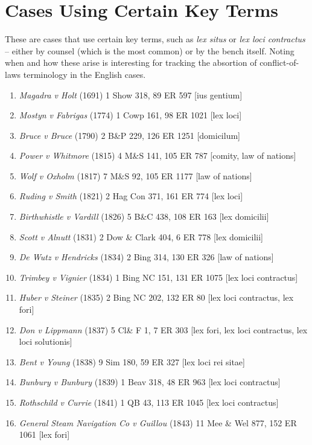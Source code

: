 \documentclass[twoside]{article}
\begin{document}
\section{Cases Using Certain Key Terms}

These are cases that use certain key terms, such as \textit{lex situs} or \textit{lex loci contractus} -- either by counsel (which is the most common) or by the bench itself. Noting when and how these arise is interesting for tracking the absortion of conflict-of-laws terminology in the English cases.
\\ 
\begin{enumerate}
\item{\textit{Magadra v Holt} (1691) 1 Show 318, 89 ER 597 [ius gentium]}
\item{\textit{Mostyn v Fabrigas} (1774) 1 Cowp 161, 98 ER 1021 [lex loci]}
\item{\textit{Bruce v Bruce} (1790) 2 B\&P 229, 126 ER 1251 [domicilum]}
\item{\textit{Power v Whitmore} (1815) 4 M\&S 141, 105 ER 787 [comity, law of nations]}
\item{\textit{Wolf v Oxholm} (1817) 7 M\&S 92, 105 ER 1177 [law of nations]}
\item{\textit{Ruding v Smith} (1821) 2 Hag Con 371, 161 ER 774 [lex loci]}
\item{\textit{Birthwhistle v Vardill} (1826) 5 B\&C 438, 108 ER 163 [lex domicilii]}
\item{\textit{Scott v Alnutt} (1831) 2 Dow \& Clark 404, 6 ER 778 [lex domicilii]}
\item{\textit{De Wutz v Hendricks} (1834) 2 Bing 314, 130 ER 326 [law of nations]}
\item{\textit{Trimbey v Vignier} (1834) 1 Bing NC 151, 131 ER 1075 [lex loci contractus]}
\item{\textit{Huber v Steiner} (1835) 2 Bing NC 202, 132 ER 80 [lex loci contractus, lex fori]}
\item{\textit{Don v Lippmann} (1837) 5 Cl\& F 1, 7 ER 303 [lex fori, lex loci contractus, lex loci solutionis]}
\item{\textit{Bent v Young} (1838) 9 Sim 180, 59 ER 327 [lex loci rei sitae]}
\item{\textit{Bunbury v Bunbury} (1839) 1 Beav 318, 48 ER 963 [lex loci contractus]}
\item{\textit{Rothschild v Currie} (1841) 1 QB 43, 113 ER 1045 [lex loci contractus]}
\item{\textit{General Steam Navigation Co v Guillou} (1843) 11 Mee \& Wel 877, 152 ER 1061 [lex fori]}

\end{enumerate}
\end{document}
